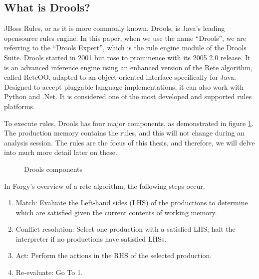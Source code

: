 \subsection{What is Drools?}\label{section:WhatIsDrools}

JBoss Rules, or as it is more commonly known, Drools, is Java's leading opensource rules engine.
In this paper, when we use the name ``Drools'', we are referring to the ``Drools Expert'', which is the rule engine module of the Drools Suite.
Drools started in 2001 but rose to prominence with its 2005 2.0 release.
It is an advanced inference engine using an enhanced version of the Rete algorithm, called Rete\-OO\cite{sottara2010configurable}, adapted to an object-oriented interface specifically for Java.
Designed to accept pluggable language implementations, it can also work with Python and .Net.
It is considered one of the most developed and supported rules platforms.

To execute rules, Drools has four major components, as demonstrated in figure \ref{fig:Drools_components}.
The production memory contains the rules, and this will not change during an analysis session.
The rules are the focus of this thesis, and therefore, we will delve into much more detail later on these.

\begin{figure}[h]
    \centering
    \caption{Drools components}
    \label{fig:Drools_components}
\end{figure}

In Forgy's\cite{forgy1989rete} overview of a rete algorithm, the following steps occur.
\begin{enumerate}
    \setlength\itemsep{0em}
    \item Match: Evaluate the Left-hand sides (LHS) of the productions to determine which are satisfied given the current contents of working memory.
    \item Conflict resolution: Select one production with a satisfied LHS; halt the interpreter if no productions have satisfied LHSs.
    \item Act: Perform the actions in the RHS of the selected production.
    \item Re-evaluate: Go To 1.
\end{enumerate}

